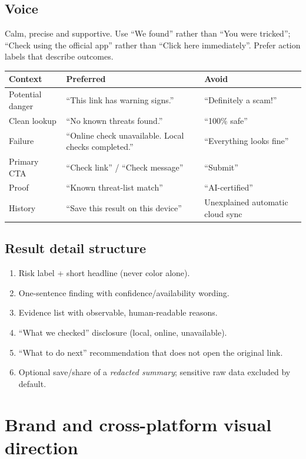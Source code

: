 \documentclass[10pt,a4paper]{article}
\begin{document}
\subsection{Voice}
Calm, precise and supportive. Use ``We found'' rather than ``You were tricked''; ``Check using the official app'' rather than ``Click here immediately''. Prefer action labels that describe outcomes.
\begin{tabularx}{\linewidth}{@{}p{32mm}Y Y@{}}\toprule
\textbf{Context} & \textbf{Preferred} & \textbf{Avoid} \\ \midrule
Potential danger & ``This link has warning signs.'' & ``Definitely a scam!'' \\
Clean lookup & ``No known threats found.'' & ``100\% safe'' \\
Failure & ``Online check unavailable. Local checks completed.'' & ``Everything looks fine'' \\
Primary CTA & ``Check link'' / ``Check message'' & ``Submit'' \\
Proof & ``Known threat-list match'' & ``AI-certified'' \\
History & ``Save this result on this device'' & Unexplained automatic cloud sync \\
\bottomrule\end{tabularx}
\subsection{Result detail structure}
\begin{enumerate}
\item Risk label + short headline (never color alone).
\item One-sentence finding with confidence/availability wording.
\item Evidence list with observable, human-readable reasons.
\item ``What we checked'' disclosure (local, online, unavailable).
\item ``What to do next'' recommendation that does not open the original link.
\item Optional save/share of a \emph{redacted summary}; sensitive raw data excluded by default.
\end{enumerate}

\section{Brand and cross-platform visual direction}
\end{document}
